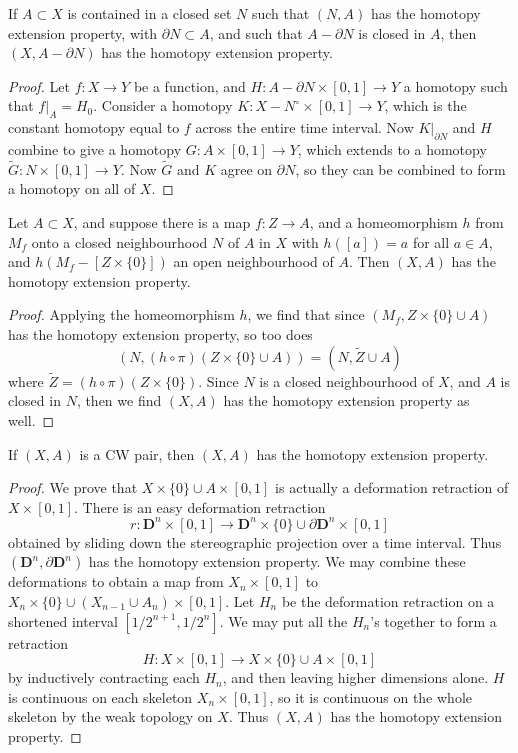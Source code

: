 \begin{lemma}
    If $A \subset X$ is contained in a closed set $N$ such that $(N,A)$ has the homotopy extension property, with $\partial N \subset A$, and such that $A - \partial N$ is closed in $A$, then $(X,A - \partial N)$ has the homotopy extension property.
\end{lemma}
\begin{proof}
    Let $f: X \to Y$ be a function, and $H: A - \partial N \times [0,1] \to Y$ a homotopy such that $f|_A = H_0$. Consider a homotopy $K: X - N^\circ \times [0,1] \to Y$, which is the constant homotopy equal to $f$ across the entire time interval. Now $K|_{\partial N}$ and $H$ combine to give a homotopy $G: A \times [0,1] \to Y$, which extends to a homotopy $\tilde{G}: N \times [0,1] \to Y$. Now $\tilde{G}$ and $K$ agree on $\partial N$, so they can be combined to form a homotopy on all of $X$.
\end{proof}

\begin{theorem}
    Let $A \subset X$, and suppose there is a map $f:Z \to A$, and a homeomorphism $h$ from $M_f$ onto a closed neighbourhood $N$ of $A$ in $X$ with $h([a]) = a$ for all $a \in A$, and $h(M_f - [Z \times \{ 0 \}])$ an open neighbourhood of $A$. Then $(X,A)$ has the homotopy extension property.
\end{theorem}
\begin{proof}
    Applying the homeomorphism $h$, we find that since $(M_f, Z \times \{ 0 \} \cup A)$ has the homotopy extension property, so too does
    \[ (N, (h \circ \pi)(Z \times \{ 0 \} \cup A)) = (N, \tilde{Z} \cup A) \]
    where $\tilde{Z} = (h \circ \pi)(Z \times \{ 0 \})$. Since $N$ is a closed neighbourhood of $X$, and $A$ is closed in $N$, then we find $(X,A)$ has the homotopy extension property as well.
\end{proof}

\begin{theorem}
    If $(X,A)$ is a CW pair, then $(X,A)$ has the homotopy extension property.
\end{theorem}
\begin{proof}
    We prove that $X \times \{ 0 \} \cup A \times [0,1]$ is actually a deformation retraction of $X \times [0,1]$. There is an easy deformation retraction
    \[ r: \mathbf{D}^n \times [0,1] \to \mathbf{D}^n \times \{ 0 \} \cup \partial \mathbf{D}^n \times [0,1] \]
    obtained by sliding down the stereographic projection over a time interval. Thus $(\mathbf{D}^n, \partial \mathbf{D}^n)$ has the homotopy extension property. We may combine these deformations to obtain a map from $X_n \times [0,1]$ to $X_n \times \{ 0 \} \cup (X_{n-1} \cup A_n) \times [0,1]$. Let $H_n$ be the deformation retraction on a shortened interval $[1/2^{n+1}, 1/2^n]$. We may put all the $H_n$'s together to form a retraction
    \[ H: X \times [0,1] \to X \times \{ 0 \} \cup A \times [0,1] \]
    by inductively contracting each $H_n$, and then leaving higher dimensions alone. $H$ is continuous on each skeleton $X_n \times [0,1]$, so it is continuous on the whole skeleton by the weak topology on $X$. Thus $(X, A)$ has the homotopy extension property.
\end{proof}

